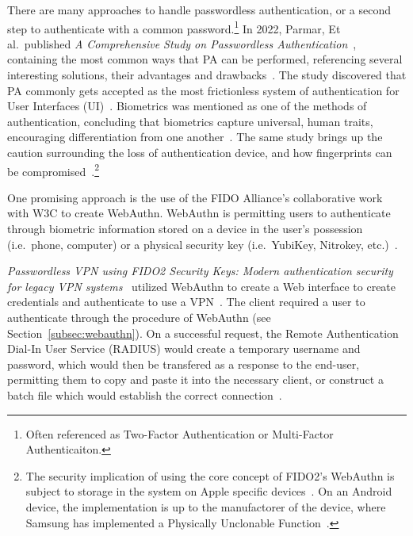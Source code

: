 There are many approaches to handle passwordless authentication, or a second
step to authenticate with a common password.\footnote{
  Often referenced as Two-Factor Authentication or Multi-Factor Authenticaiton.
}
In 2022, Parmar, Et al.\ published
\textit{A Comprehensive Study on Passwordless Authentication}~\cite{parmar2022},
containing the most common ways that PA can be performed, referencing several
interesting solutions, their advantages and drawbacks~\cite{parmar2022}.
The study discovered that PA commonly gets accepted as the most frictionless
system of authentication for User Interfaces (UI)~\cite{parmar2022}.
Biometrics was mentioned as one of the methods of authentication, concluding
that biometrics capture universal, human traits, encouraging differentiation
from one another~\cite{parmar2022}.
The same study brings up the caution surrounding the loss of authentication
device, and how fingerprints can be compromised~\cite{parmar2022}.\footnote{
  The security implication of using the core concept of FIDO2's WebAuthn is
  subject to storage in the system on Apple specific devices~\cite{appleSecureEnclave}.
  On an Android device, the implementation is up to the manufactorer of the
  device, where Samsung has implemented a Physically Unclonable
  Function~\cite{lee2021samsung}.
}

One promising approach is the use of the FIDO Alliance's collaborative work with
W3C to create WebAuthn.
WebAuthn is permitting users to authenticate through biometric information
stored on a device in the user's possession (i.e.\ phone, computer) or a
physical security key (i.e.\ YubiKey, Nitrokey, etc.)~\cite{webauthn_level_2}.

\textit{Passwordless VPN using FIDO2 Security Keys: Modern authentication
security for legacy VPN systems}~\cite{huseynov2022passwordless} utilized
WebAuthn to create a Web interface to create credentials and authenticate to use
a VPN~\cite{huseynov2022passwordless}.
The client required a user to authenticate through the procedure of WebAuthn
(see Section~\ref{subsec:webauthn}).
On a successful request, the Remote Authentication Dial-In User Service (RADIUS)
would create a temporary username and password, which would then be transfered
as a response to the end-user, permitting them to copy and paste it into the
necessary client, or construct a batch file which would establish the correct
connection~\cite{huseynov2022passwordless}.

